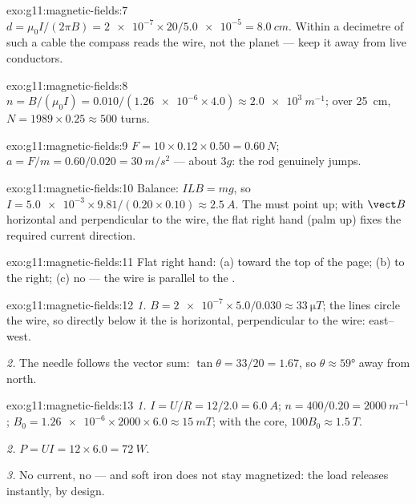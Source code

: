 \begin{solution}{exo:g11:magnetic-fields:7}
$d = \mu_0 I / (2\pi B) = \num{2e-7} \times 20 / \num{5.0e-5}
= \qty{8.0}{cm}$. Within a decimetre of such a cable the compass reads
the wire, not the planet --- keep it away from live conductors.
\end{solution}

\begin{solution}{exo:g11:magnetic-fields:8}
$n = B/(\mu_0 I) = 0.010 / (\num{1.26e-6} \times 4.0)
\approx \qty{2.0e3}{m^{-1}}$; over \qty{25}{cm},
$N = 1989 \times 0.25 \approx 500$ turns.
\end{solution}

\begin{solution}{exo:g11:magnetic-fields:9}
$F = 10 \times 0.12 \times 0.50 = \qty{0.60}{N}$;
$a = F/m = 0.60/0.020 = \qty{30}{m/s^2}$ --- about $3g$: the rod
genuinely jumps.
\end{solution}

\begin{solution}{exo:g11:magnetic-fields:10}
Balance: $ILB = mg$, so
$I = \num{5.0e-3} \times 9.81 / (0.20 \times 0.10) \approx
\qty{2.5}{A}$. The  must point up; with $\vect B$ horizontal and
perpendicular to the wire, the flat right hand (palm up) fixes the
required current direction.
\end{solution}

\begin{solution}{exo:g11:magnetic-fields:11}
Flat right hand: (a) toward the top of the page; (b) to the right;
(c) no  --- the wire is parallel to the .
\end{solution}

\begin{solution}{exo:g11:magnetic-fields:12}
\emph{1.} $B = \num{2e-7} \times 5.0 / 0.030 \approx
\qty{33}{\micro T}$; the lines circle the wire, so directly below it
the  is horizontal, perpendicular to the wire: east--west.

\emph{2.} The needle follows the vector sum: $\tan\theta = 33/20 =
1.67$, so $\theta \approx \ang{59}$ away from north.
\end{solution}

\begin{solution}{exo:g11:magnetic-fields:13}
\emph{1.} $I = U/R = 12/2.0 = \qty{6.0}{A}$;
$n = 400/0.20 = \qty{2000}{m^{-1}}$;
$B_0 = \num{1.26e-6} \times 2000 \times 6.0 \approx \qty{15}{mT}$;
with the core, $100 B_0 \approx \qty{1.5}{T}$.

\emph{2.} $P = UI = 12 \times 6.0 = \qty{72}{W}$.

\emph{3.} No current, no  --- and soft iron does not stay
magnetized: the load releases instantly, by design.
\end{solution}

